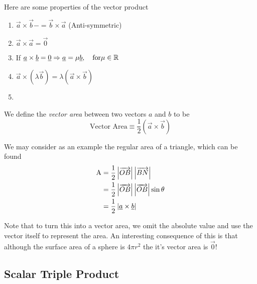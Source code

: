 \documentclass{article}
\numberwithin{equation}{section}
\begin{document}
Here are some properties of the vector product
\begin{enumerate}
    \item $\vec{a} \times \vec{b} - = \vec{b} \times \vec{a}$ \hspace*{\fill}(Anti-symmetric)
    \item $\vec{a} \times \vec{a} = \vec{0}$
    \item If $\underline{a} \times \underline{b} = \underline{0} \Rightarrow \underline{a} = \mu\underline{b}, \quad \text{for} \mu \in \mathbb{R}$
    \item $\vec{a} \times (\lambda \vec{b}) = \lambda (\vec{a} \times \vec{b})$
    \item[] \hspace*{\fill}\ilnumberthis
\end{enumerate}

\begin{defi}
    We define the \emph{vector area} between two vectors $a$ and $b$ to be
    \[  
        \text{Vector Area} \equiv \frac{1}{2}(\vec{a} \times \vec{b})
    \]

    We may consider as an example the regular area of  a triangle, which can be found
    \begin{align*}
        \text{A} &= \frac{1}{2}\left\lvert \overrightarrow{OB}\right\rvert\left\lvert \overrightarrow{BN}\right\rvert \\
        &=  \frac{1}{2}\left\lvert \overrightarrow{OB}\right\rvert\left\lvert \overrightarrow{OB}\right\rvert\sin{\theta} \\
        &= \frac{1}{2}\left\lvert \underline{a} \times \underline{b}\right\rvert
    \end{align*}
    
    Note that to turn this into a vector area, we omit the absolute value and use the vector itself to represent the area. An interesting consequence of this is that although the surface area of a sphere is $4\pi r^2$ the it's vector area is $\vec{0}$!
\end{defi}

\subsection{Scalar Triple Product}
\end{document}
